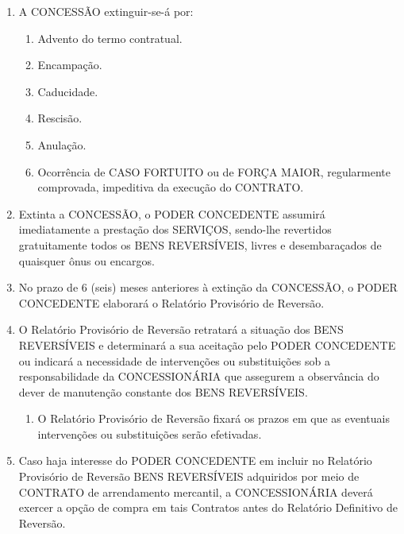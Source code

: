 \documentclass[a4paper,11pt]{report} %
\begin{document}
\begin{enumerate}
\item \label{itm:7VMR} A CONCESSÃO extinguir-se-á por:

\begin{enumerate}[label*=\arabic*.]
\item \label{itm:X3UP} Advento do termo contratual.

\item \label{itm:FXAZ} Encampação.

\item \label{itm:9VRD} Caducidade.

\item \label{itm:8MR2} Rescisão.

\item \label{itm:4367} Anulação.

\item \label{itm:Y6PV} Ocorrência de CASO FORTUITO ou de FORÇA MAIOR, regularmente comprovada, impeditiva da execução do CONTRATO.
\end{enumerate}

\item \label{itm:YH65} Extinta a CONCESSÃO, o PODER CONCEDENTE assumirá imediatamente a prestação dos SERVIÇOS, sendo-lhe revertidos gratuitamente todos os BENS REVERSÍVEIS, livres e desembaraçados de quaisquer ônus ou encargos.

\item \label{itm:B653} No prazo de 6 (seis) meses anteriores à extinção da CONCESSÃO, o PODER CONCEDENTE elaborará o Relatório Provisório de Reversão.

\item \label{itm:MQ8C} O Relatório Provisório de Reversão retratará a situação dos BENS REVERSÍVEIS e determinará a sua aceitação pelo PODER CONCEDENTE ou indicará a necessidade de intervenções ou substituições sob a responsabilidade da CONCESSIONÁRIA que assegurem a observância do dever de manutenção constante dos BENS REVERSÍVEIS.

\begin{enumerate}[label*=\arabic*.]
\item \label{itm:XEYD} O Relatório Provisório de Reversão fixará os prazos em que as eventuais intervenções ou substituições serão efetivadas.
\end{enumerate}

\item \label{itm:C7UN} Caso haja interesse do PODER CONCEDENTE em incluir no Relatório Provisório de Reversão BENS REVERSÍVEIS adquiridos por meio de CONTRATO de arrendamento mercantil, a CONCESSIONÁRIA deverá exercer a opção de compra em tais Contratos antes do Relatório Definitivo de Reversão.


\end{enumerate}
\end{document}

